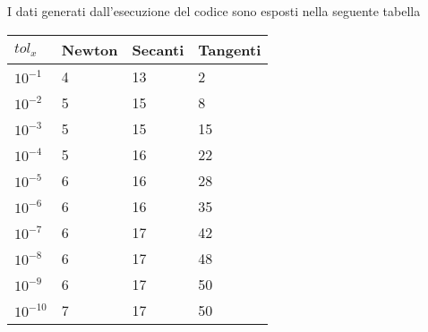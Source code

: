 

I dati generati dall'esecuzione del codice sono esposti  nella seguente tabella

\begin{tabular}{llll}

$tol_x$ & Newton & Secanti & Tangenti \\
\hline
$10^{-1}$ & 4 & 13 & 2 \\
$10^{-2}$ & 5 & 15 & 8 \\
$10^{-3}$ & 5  & 15 & 15 \\
$10^{-4}$ & 5 & 16 & 22 \\
$10^{-5}$ & 6 & 16 & 28 \\
$10^{-6}$ & 6 & 16 & 35 \\
$10^{-7}$ & 6 & 17 & 42 \\
$10^{-8}$ & 6 & 17 & 48 \\
$10^{-9}$ & 6 & 17 & 50 \\
$10^{-10}$ & 7 & 17 & 50 \\
\hline
\end{tabular}
